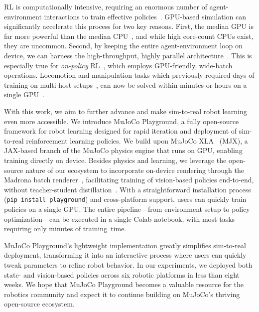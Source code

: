 RL is computationally intensive, requiring an enormous number of agent-environment interactions to train effective policies~\cite{ibarz2021train}. GPU-based simulation can significantly accelerate this process for two key reasons. First, the median GPU is far more powerful than the median CPU~\cite{wang2020benchmarking}, and while high core-count CPUs exist, they are uncommon. Second, by keeping the entire agent-environment loop on device, we can harness the high-throughput, highly parallel architecture~\cite{makoviychuk2021isaac, freeman2021brax}. This is especially true for \emph{on-policy} RL~\cite{schulman2017proximal, andrychowicz2020matters}, which employs GPU-friendly, wide-batch operations. Locomotion and manipulation tasks which previously required days of training on multi-host setups~\cite{andrychowicz2020learning,tan2018sim}, can now be solved within minutes or hours on a single GPU~\cite{rudin2022learning, handa2023dextreme}.

With this work, we aim to further advance and make sim-to-real robot learning even more accessible. We introduce MuJoCo Playground, a fully open-source framework for robot learning designed for rapid iteration and deployment of sim-to-real reinforcement learning policies. We build upon MuJoCo XLA~\cite{mujocoxla} (MJX), a JAX-based branch of the MuJoCo physics engine that runs on GPU, enabling training directly on device. Besides physics and learning, we leverage the open-source nature of our ecosystem to incorporate on-device rendering through the Madrona batch renderer~\cite{shacklett2023extensible}, facilitating training of vision-based policies end-to-end, without teacher-student distillation~\cite{agarwal2023legged}. With a straightforward installation process (\texttt{pip install playground}) and cross-platform support, users can quickly train policies on a single GPU. The entire pipeline---from environment setup to policy optimization---can be executed in a single Colab notebook, with most tasks requiring only minutes of training~time.

MuJoCo Playground’s lightweight implementation greatly simplifies sim-to-real deployment, transforming it into an interactive process where users can quickly tweak parameters to refine robot behavior. In our experiments, we deployed both state- and vision-based policies across six robotic platforms in less than eight weeks. We hope that MuJoCo Playground becomes a valuable resource for the robotics community and  expect it to continue building on MuJoCo's thriving open-source ecosystem.

